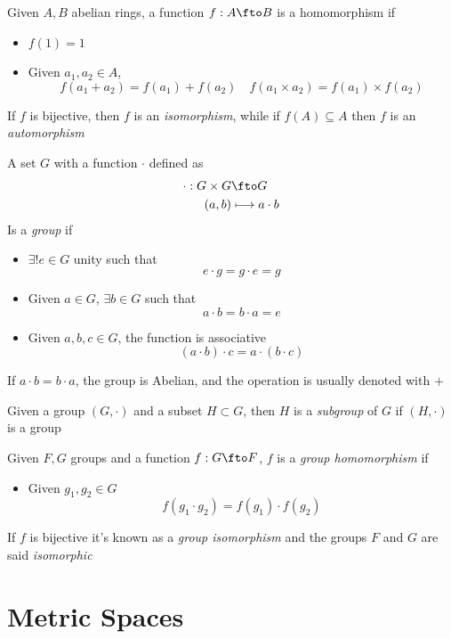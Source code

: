 \documentclass[../mmf.tex]{subfiles}
\begin{document}
\begin{dfn}
	Given $A, B$ abelian rings, a function $f:A\fto B$ is a homomorphism if
	\begin{itemize}
	\item $f(1)=1$
	\item Given $a_1, a_2\in A$, 
		$$f(a_1+a_2)=f(a_1)+f(a_2)\quad f(a_1\times a_2)=f(a_1)\times f(a_2)$$
	\end{itemize}
	If $f$ is bijective, then $f$ is an \textit{isomorphism}, while if $f(A)\subseteq A$ then $f$ is an \textit{automorphism}
\end{dfn}
\begin{dfn}[Group]
	A set $G$ with a function $\cdot$ defined as
	\begin{equation*}
		\begin{aligned}
			\cdot:G\times G&\fto G\\
			(a, b)&\longmapsto a\cdot b
		\end{aligned}
	\end{equation*}
	Is a \textit{group} if
	\begin{itemize}
	\item $\exists! e\in G$ unity such that
		$$e\cdot g=g\cdot e=g$$
	\item Given $a\in G$, $\exists b \in G$ such that
		$$a\cdot b=b\cdot a=e$$
	\item Given $a, b, c\in G$, the function is associative
		$$(a\cdot b)\cdot c=a\cdot(b\cdot c)$$
	\end{itemize}
	If $a\cdot b=b\cdot a$, the group is Abelian, and the operation is usually denoted with $+$
\end{dfn}
\begin{dfn}[Subgroup]
	Given a group $(G,\cdot)$ and a subset $H\subset G$, then $H$ is a \textit{subgroup} of $G$ if $(H,\cdot)$ is a group
\end{dfn}
\begin{dfn}
	Given $F, G$ groups and a function $f:G\fto F$, $f$ is a \textit{group homomorphism} if
	\begin{itemize}
	\item Given $g_1, g_2\in G$
		$$f(g_1\cdot g_2)=f(g_1)\cdot f(g_2)$$
	\end{itemize}
	If $f$ is bijective it's known as a \textit{group isomorphism} and the groups $F$ and $G$ are said \textit{isomorphic}
\end{dfn}
\section{Metric Spaces}
\end{document}
